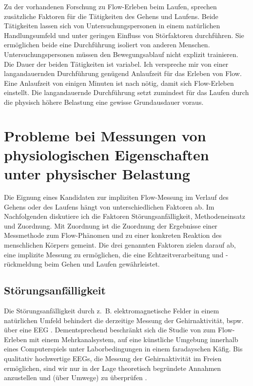 Zu der vorhandenen Forschung zu Flow-Erleben beim Laufen, sprechen zusätzliche Faktoren für die Tätigkeiten des Gehens und Laufens. Beide Tätigkeiten lassen sich von Untersuchungspersonen in einem natürlichen Handlungsumfeld und unter geringen Einfluss von Störfaktoren durchführen. Sie ermöglichen beide eine Durchführung isoliert von anderen Menschen. Untersuchungspersonen müssen den Bewegungsablauf nicht explizit trainieren. Die Dauer der beiden Tätigkeiten ist variabel. Ich verspreche mir von einer langandauernden Durchführung genügend Anlaufzeit für das Erleben von Flow. Eine Anlaufzeit von einigen Minuten ist nach \citet[S.~109]{Henk2014} nötig, damit sich Flow-Erleben einstellt. Die langandauernde Durchführung setzt zumindest für das Laufen durch die physisch höhere Belastung eine gewisse Grundausdauer voraus.

\section{Probleme bei Messungen von physiologischen Eigenschaften unter physischer Belastung}
\label{sec:probleme_bei_messungen}
Die Eignung eines Kandidaten zur impliziten Flow-Messung im Verlauf des Gehens oder des Laufens hängt von unterschiedlichen Faktoren ab. Im Nachfolgenden diskutiere ich die Faktoren Störungsanfälligkeit, Methodeneinsatz und Zuordnung. Mit Zuordnung ist die Zuordnung der Ergebnisse einer Messmethode zum Flow-Phänomen und zu einer konkreten Reaktion des menschlichen Körpers gemeint. Die drei genannten Faktoren zielen darauf ab, eine implizite Messung zu ermöglichen, die eine Echtzeitverarbeitung und -rückmeldung beim Gehen und Laufen gewährleistet.

\subsection{Störungsanfälligkeit}
Die Störungsanfälligkeit durch z.~B. elektromagnetische Felder in einem natürlichen Umfeld behindert die derzeitige Messung der Gehirnaktivität, bspw. über eine \ac{EEG} \citep[vgl.][S.~56]{Henk2014}. Dementsprechend beschränkt sich die Studie von \citet{Hugentobler2011} zum Flow-Erleben mit einem Mehrkanalsystem, auf eine künstliche Umgebung innerhalb eines Computerspiels unter Laborbedingungen in einem faradayschen Käfig. Bis qualitativ hochwertige \acp{EEG}, die Messung der Gehirnaktivität im Freien ermöglichen, sind wir nur in der Lage theoretisch begründete Annahmen anzustellen und (über Umwege) zu überprüfen \citep[vgl.][S.~56]{Henk2014}.

